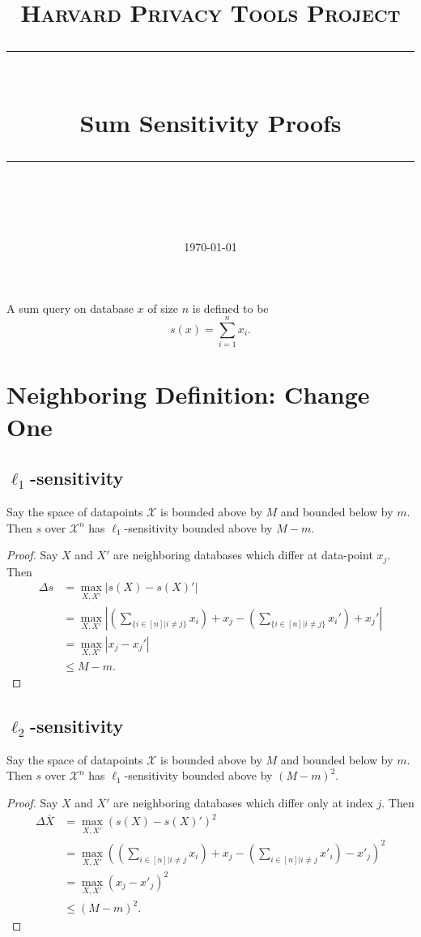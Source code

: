 \documentclass[11pt]{scrartcl} %
\title{
	\normalfont\normalsize
	\textsc{Harvard Privacy Tools Project}\\ %
	\vspace{25pt} %
	\rule{\linewidth}{0.5pt}\\ %
	\vspace{20pt} %
	{\huge Sum Sensitivity Proofs}\\ %
	\vspace{12pt} %
	\rule{\linewidth}{2pt}\\ %
	\vspace{12pt} %
}
\date{\normalsize\today} %
\begin{document}
\maketitle

\begin{definition}
A sum query on database $x$ of size $n$ is defined to be
$$s(x) = \sum_{i=1}^n x_i.$$
\end{definition}

\section{Neighboring Definition: Change One}

\subsection{$\ell_1$-sensitivity}
\begin{theorem}
Say the space of datapoints $\mathcal{X}$ is bounded above by $M$ and bounded below by $m$. Then $s$ over $\mathcal{X}^n$ has $\ell_1$-sensitivity bounded above by $M-m.$
\end{theorem}

\begin{proof}
Say $X$ and $X'$ are neighboring databases which differ at data-point $x_j$. Then
\begin{align*}
\Delta{s} &= \max_{X,X'} \left\vert s(X) - s(X)' \right\vert \\
	&=  \max_{X,X'} \left\vert \left(\sum_{\{ i \in [n] \vert i \ne j\}} x_i\right) + x_j  - \left(\sum_{\{ i \in [n] \vert i \ne j\}} x_i'\right) + x_j'  \right\vert \\
	&= \max_{X,X'} \left\vert x_j - x_j' \right\vert \\
	&\le M-m.
\end{align*}
\end{proof}

\subsection{$\ell_2$-sensitivity}
\begin{theorem}
	Say the space of datapoints $\mathcal{X}$ is bounded above by $M$ and bounded below by $m$.
	Then $s$ over $\mathcal{X}^n$ has $\ell_1$-sensitivity bounded above by $(M-m)^2.$
\end{theorem}

\begin{proof}
	Say $X$ and $X'$ are neighboring databases which differ only at index $j$. Then
	\begin{align*}
		\Delta{\bar{X}} &= \max_{X,X'} (s(X) - s(X)')^2 \\
						&= \max_{X,X'} \left(
								\left( \sum_{i \in [n] | i \neq j} x_i \right) + x_j -
								\left( \sum_{i \in [n] | i \neq j} x'_i \right) - x'_j
							\right)^2 \\
						&= \max_{X,X'} (x_j - x'_j)^2 \\
						&\leq (M-m)^2.
	\end{align*}
\end{proof}
\end{document}
